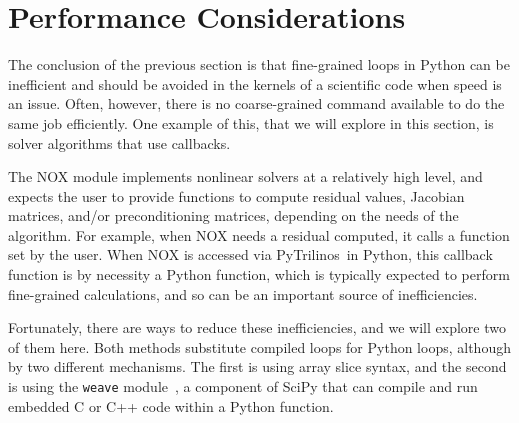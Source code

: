 \documentclass[acmtocl]{acmtrans2m}
\newcommand{\PyTrilinos}{{PyTrilinos}}
\begin{document}
\section{Performance Considerations}
\label{sec:performance}

The conclusion of the previous section is that fine-grained loops in
Python can be inefficient and should be avoided in the kernels of a
scientific code when speed is an issue.  Often, however, there is no
coarse-grained command available to do the same job efficiently.  One
example of this, that we will explore in this section, is solver
algorithms that use callbacks.

The NOX module implements nonlinear solvers at a relatively high
level, and expects the user to provide functions to compute residual
values, Jacobian matrices, and/or preconditioning matrices,
depending on the needs of the algorithm.  For example, when NOX
needs a residual computed, it calls a function set by the user. When
NOX is accessed via \PyTrilinos\ in Python, this callback function
is by necessity a Python function, which is typically expected to
perform fine-grained calculations, and so can be an important source
of inefficiencies.

Fortunately, there are ways to reduce these inefficiencies, and we
will explore two of them here.  Both methods substitute compiled loops
for Python loops, although by two different mechanisms.  The first is
using array slice syntax, and the second is using the {\tt weave}
module~\cite{Weave-Users-Guide}, a component of SciPy that can compile
and run embedded C or C++ code within a Python function.
\end{document}
